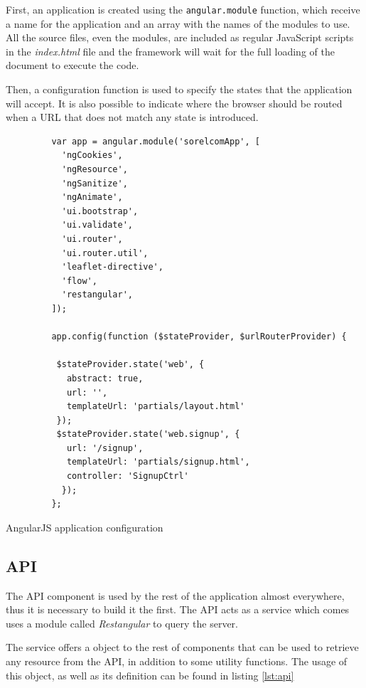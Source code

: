 First, an application is created using the \texttt{angular.module} function, which receive a name for the application and an array with the names of the modules to use. All the source files, even the modules, are included as regular JavaScript scripts in the \textit{index.html} file and the framework will wait for the full loading of the document to execute the code.

Then, a configuration function is used to specify the states that the application will accept. It is also possible to indicate where the browser should be routed when a URL that does not match any state is introduced.

\begin{listing}[ht]\centering
  \begin{minipage}{.85\textwidth}
    \begin{verbatim}
         var app = angular.module('sorelcomApp', [
           'ngCookies',
           'ngResource',
           'ngSanitize',
           'ngAnimate',
           'ui.bootstrap',
           'ui.validate',
           'ui.router',
           'ui.router.util',
           'leaflet-directive',
           'flow',
           'restangular',
         ]);
          
         app.config(function ($stateProvider, $urlRouterProvider) {
          
          $stateProvider.state('web', {
            abstract: true,
            url: '',
            templateUrl: 'partials/layout.html'
          });
          $stateProvider.state('web.signup', {
            url: '/signup',
            templateUrl: 'partials/signup.html',
            controller: 'SignupCtrl'
           });
         };
    \end{verbatim}
  \end{minipage}
  \caption{AngularJS application configuration}\label{lst:app}
\end{listing}

\subsection{API}

The API component is used by the rest of the application almost everywhere, thus it is necessary to build it the first. The API acts as a service which comes uses a module called \textit{Restangular} to query the server.

The service offers a object to the rest of components that can be used to retrieve any resource from the API, in addition to some utility functions. The usage of this object, as well as its definition can be found in listing \ref{lst:api}

